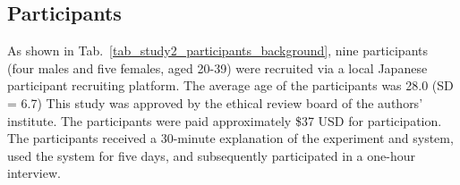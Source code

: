 % 

\subsection{Participants}

As shown in Tab.~\ref{tab_study2_participants_background}, nine participants (four males and five females, aged 20-39) were recruited via a local Japanese participant recruiting platform.
The average age of the participants was 28.0 (SD = 6.7)
This study was approved by the ethical review board of the authors' institute.
The participants were paid approximately \$37 USD for participation.
The participants received a 30-minute explanation of the experiment and system, used the system for five days, and subsequently participated in a one-hour interview.

